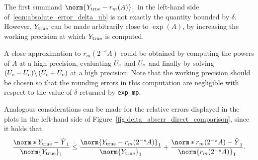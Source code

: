 \begin{oss*}
	The first summand $\norm{Y_{\textup{true}}-r_m(A)}_1$ in the left-hand side of~\eqref{eqn:absolute_error_delta_ub} is not exactly the quantity bounded by $\delta$. However, $Y_{\textup{true}}$ can be made arbitrarily close to $\exp(A)$, by increasing the working precision at which $Y_{\textup{true}}$ is computed.
	
	A close approximation to $r_m(2^{-s}A)$ could be obtained by computing the powers of $A$ at a high precision, evaluating $U_{\textup{e}}$ and $U_{\textup{o}}$ and finally by solving $(U_{\textup{e}}-U_{\textup{o}})\backslash\,(U_{\textup{e}}+U_{\textup{o}})$ at a high precision. Note that the working precision should be chosen so that the rounding errors in this computation are negligible with respect to the value of $\delta$ returned by \texttt{exp\_mp}. 
	
\end{oss*}

Analogous considerations can be made for the relative errors displayed in the plots in the left-hand side of Figure~\ref{fig:delta_abserr_direct_comparison}, since it holds that 
\[
	\frac{\norm*{Y_{\textup{true}}-\hat{Y}}_1}{\norm{Y_{\textup{true}}}_1}\overset{.}{\le}\frac{\norm{Y_{\textup{true}}-r_m(2^{-s}A)}_1}{\norm{Y_{\textup{true}}}_1}+\frac{\norm*{r_m(2^{-s}A)-\hat{Y}}_1}{\norm{r_m(2^{-s}A)}_1}.
\]
